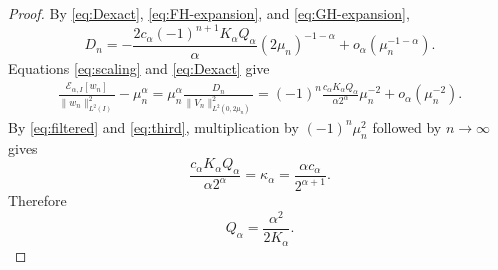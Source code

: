 \documentclass[11pt]{amsart}
\numberwithin{equation}{section}
\theoremstyle{remark}
\newcommand{\norm}[2][]{\lVert #2\rVert_{#1}}
\newcommand{\calE}{\mathcal E}
\begin{document}
\begin{proof}
By \eqref{eq:Dexact}, \eqref{eq:FH-expansion}, and
\eqref{eq:GH-expansion},
\[
 D_n=-\frac{2c_\alpha(-1)^{n+1}K_\alpha Q_\alpha}{\alpha}
 (2\mu_n)^{-1-\alpha}
 +o_\alpha(\mu_n^{-1-\alpha}).
\]
Equations \eqref{eq:scaling} and \eqref{eq:Dexact} give
\[
 \begin{aligned}
 \frac{\calE_{\alpha,I}[w_n]}{\norm[L^2(I)]{w_n}^2}
 -\mu_n^\alpha
 =\mu_n^\alpha\frac{D_n}{\norm[L^2(0,2\mu_n)]{V_n}^2}=(-1)^n\frac{c_\alpha K_\alpha Q_\alpha}
 {\alpha2^\alpha}\mu_n^{-2}+o_\alpha(\mu_n^{-2}).
 \end{aligned}
\]
By \eqref{eq:filtered} and \eqref{eq:third}, multiplication by
$(-1)^n\mu_n^2$ followed by $n\to\infty$ gives
\[
 \frac{c_\alpha K_\alpha Q_\alpha}{\alpha2^\alpha}
 =\kappa_\alpha
 =\frac{\alpha c_\alpha}{2^{\alpha+1}}.
\]
Therefore
\begin{equation}\label{eq:Q-value}
 Q_\alpha=\frac{\alpha^2}{2K_\alpha}.
\end{equation}


\end{proof}
\end{document}
